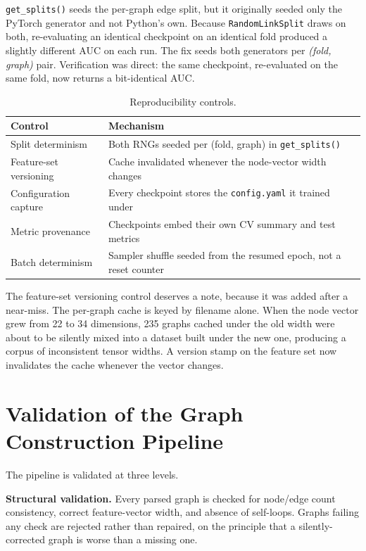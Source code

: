 \documentclass[12pt,oneside,a4paper]{report}
\begin{document}
\texttt{get\_splits()} seeds the per-graph edge split, but it originally seeded
only the PyTorch generator and not Python's own. Because \texttt{RandomLinkSplit}
draws on both, re-evaluating an identical checkpoint on an identical fold
produced a slightly different AUC on each run. The fix seeds both generators
per \emph{(fold, graph)} pair. Verification was direct: the same checkpoint,
re-evaluated on the same fold, now returns a bit-identical AUC.

\begin{table}[h]
\centering
\caption{Reproducibility controls.}
\label{tab:repro}
\small
\begin{tabularx}{\textwidth}{@{}L{4.4cm}X@{}}
\toprule
\textbf{Control} & \textbf{Mechanism} \\
\midrule
Split determinism & Both RNGs seeded per (fold, graph) in \texttt{get\_splits()} \\
Feature-set versioning & Cache invalidated whenever the node-vector width changes \\
Configuration capture & Every checkpoint stores the \texttt{config.yaml} it trained under \\
Metric provenance & Checkpoints embed their own CV summary and test metrics \\
Batch determinism & Sampler shuffle seeded from the resumed epoch, not a reset counter \\
\bottomrule
\end{tabularx}
\end{table}

The feature-set versioning control deserves a note, because it was added after
a near-miss. The per-graph cache is keyed by filename alone. When the node
vector grew from 22 to 34 dimensions, 235 graphs cached under the old width
were about to be silently mixed into a dataset built under the new one,
producing a corpus of inconsistent tensor widths. A version stamp on the
feature set now invalidates the cache whenever the vector changes.

\section{Validation of the Graph Construction Pipeline}

The pipeline is validated at three levels.

\textbf{Structural validation.} Every parsed graph is checked for node/edge
count consistency, correct feature-vector width, and absence of self-loops.
Graphs failing any check are rejected rather than repaired, on the principle
that a silently-corrected graph is worse than a missing one.
\end{document}
